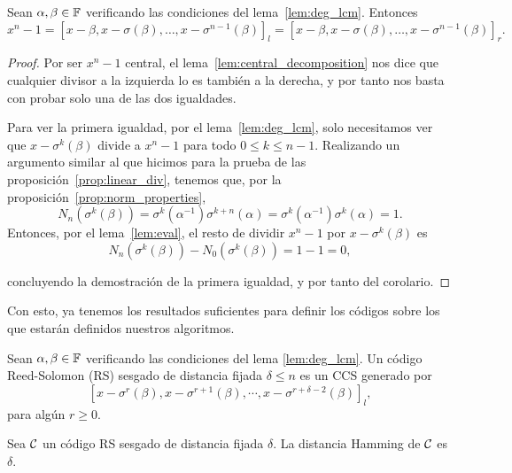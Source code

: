 \begin{corollary}
\label{cor:llcm_n}
    Sean \(\alpha, \beta \in \mathbb{F}\) verificando las condiciones del lema~\ref{lem:deg_lcm}. Entonces
\[
x^{n} - 1 = {[x - \beta, x - \sigma(\beta), \ldots, x - \sigma^{n-1}(\beta)]}_l = {[x - \beta, x - \sigma(\beta), \ldots, x - \sigma^{n-1}(\beta)]}_r
.\]
\end{corollary}
\begin{proof}
    Por ser \(x^{n} - 1\) central, el lema~\ref{lem:central_decomposition} nos dice que cualquier divisor a la izquierda lo es también a la derecha, y por tanto nos basta con probar solo una de las dos igualdades.

    Para ver la primera igualdad, por el lema~\ref{lem:deg_lcm}, solo necesitamos ver que \(x - \sigma^{k}(\beta)\) divide a \(x^{n} -1\) para todo \(0 \le k \le n-1\). Realizando un argumento similar al que hicimos para la prueba de las proposición~\ref{prop:linear_div}, tenemos que, por la proposición~\ref{prop:norm_properties},
    \[
N_n(\sigma^{k}(\beta)) = \sigma^{k}(\alpha^{-1})\sigma^{k+n}(\alpha) = \sigma^{k}(\alpha^{-1})\sigma^{k}(\alpha) = 1
    .\]
Entonces, por el lema~\ref{lem:eval}, el resto de dividir \(x^{n} -1\) por \(x - \sigma^{k}(\beta)\) es
\[
N_n(\sigma^{k}(\beta)) - N_0(\sigma^{k}(\beta)) = 1 - 1 = 0
,\]

concluyendo la demostración de la primera igualdad, y por tanto del corolario.
\end{proof}

Con esto, ya tenemos los resultados suficientes para definir los códigos sobre los que estarán definidos nuestros algoritmos.

\begin{definition}
\label{def:RS_code}
    Sean \(\alpha, \beta \in \mathbb{F}\) verificando las condiciones del lema \ref{lem:deg_lcm}. Un código Reed-Solomon (RS) sesgado de distancia fijada \(\delta \leq n\) es un CCS generado por \[{[x - \sigma^r(\beta), x - \sigma^{r+1}(\beta), \cdots, x - \sigma^{r + \delta -2}(\beta)]}_l,\] para algún \(r \geq 0\).
\end{definition}

\begin{theorem}
\label{th:distance}
    Sea \(\mathcal{C}\) un código RS sesgado de distancia fijada \(\delta\). La distancia Hamming de \(\mathcal{C}\) es \(\delta\).
\end{theorem}


